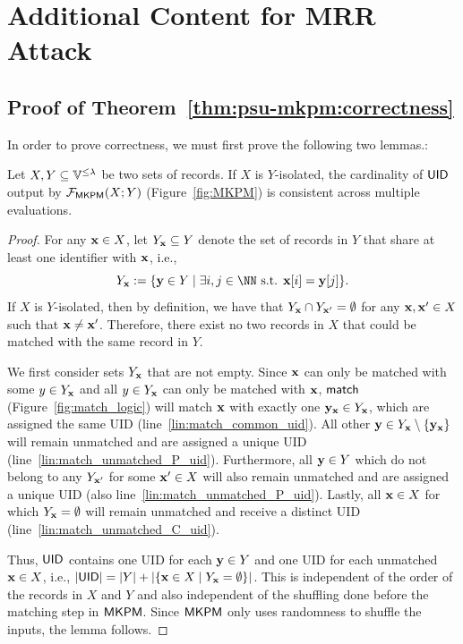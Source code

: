 \section{Additional Content for MRR Attack}\label{ap:MRR}

\subsection{Proof of Theorem~\ref{thm:psu-mkpm:correctness}}
\label{sec:psu-mkpm:correctness}

In order to prove correctness, we must first prove the following two lemmas.:

\begin{lemma}
	\label{lem:set_isolation_determinism}
	Let $X, Y \subseteq \Ispace{}^{\leq \lambda}$ be two sets of records. 
	If $X$ is $Y$-isolated, 
	the cardinality of $\mathsf{UID}$ output by $\mathcal{F}_{\mathsf{MKPM}}(X; Y)$ (Figure~\ref{fig:MKPM}) 
  is consistent across multiple evaluations.
\end{lemma}

\begin{proof}
	For any $\mathbf{x} \in X$, let $Y_{\mathbf{x}}\subseteq Y$ denote the set of records in $Y$
  that share at least one identifier with $\mathbf{x}$,
	i.e., 
  \[
    Y_\bx := \{\by \in Y \setdsc \exists i, j \in \NN \text{ s.t. } \bx[i] = \by[j]\}.
  \]
	If $X$ is $Y$-isolated, then by definition, we have that $Y_{\mathbf{x}} \cap Y_{\mathbf{x}'} = \emptyset$ 
  for any $\mathbf{x}, \mathbf{x}' \in X$ such that $\mathbf{x} \neq \mathbf{x}'$. 
	Therefore, there exist no two records in $X$ that could be 
  matched with the same record in $Y$.
	
	We first consider sets $Y_{\mathbf{x}}$ that are not empty.
	Since $\mathbf{x}$ can only be matched with some $y \in Y_{\mathbf{x}}$ and all $y \in Y_{\mathbf{x}}$ 
  can only be matched with $\mathbf{x}$,
	$\mathsf{match}$ (Figure~\ref{fig:match_logic}) will match $\mathbf{x}$ with exactly one 
  $\mathbf{y}_{\mathbf{x}} \in Y_{\mathbf{x}}$, which are assigned the same UID 
  (line~\ref{lin:match_common_uid}).
	All other $\mathbf{y} \in Y_{\mathbf{x}}\setminus\{\mathbf{y}_{\mathbf{x}}\}$ will remain unmatched 
  and are assigned a unique UID (line~\ref{lin:match_unmatched_P_uid}).
  Furthermore, all $\mathbf{y} \in Y$ which do not belong to any $Y_{\mathbf{x}'}$ 
  for some $\mathbf{x}' \in X$ will also remain unmatched and are 
  assigned a unique UID (also line~\ref{lin:match_unmatched_P_uid}).
	Lastly, all $\mathbf{x}\in X$ for which $Y_{\mathbf{x}} = \emptyset$ will remain 
  unmatched and receive a distinct UID (line~\ref{lin:match_unmatched_C_uid}). 
	
	Thus, $\mathsf{UID}$ contains one UID for each $\mathbf{y}\in Y$ and one UID for 
  each unmatched $\mathbf{x}\in X$, i.e.,
	$|\mathsf{UID}| = |Y| + |\{\mathbf{x} \in X \; | \; Y_{\mathbf{x}} = \emptyset\}|$.
	This is independent of the order of the records in $X$ and $Y$ and
	also independent of the shuffling done before the matching step in $\mathsf{MKPM}$.
	Since $\mathsf{MKPM}$ only uses randomness to shuffle the inputs, the lemma follows.
\end{proof}

